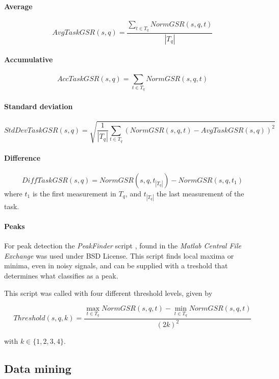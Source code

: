 \documentclass[11pt,leqno,a4paper]{report} %
\begin{document}
\paragraph{Average}

\[
AvgTaskGSR(s,q) = \frac { \sum_{t \in T_q} NormGSR(s,q,t) }
{\left\vert{T_q}\right\vert }
\]

\paragraph{Accumulative}

\[
AccTaskGSR(s,q) =  \sum_{t \in T_q} NormGSR(s,q,t)
\]

\paragraph{Standard deviation}

\[
StdDevTaskGSR(s,q) = \sqrt {\frac{1}{\left\vert{T_q}\right\vert}   \sum_{t \in T_q} (NormGSR(s,q,t) - AvgTaskGSR(s,q))^2 }
\]

\paragraph{Difference}

\[
DiffTaskGSR(s,q) = NormGSR(s,q, t_{\left\vert{T_q}\right\vert}) - NormGSR(s,q, t_1)
\]
where $t_1$ is the first measurement in $T_q$, and $t_{\left\vert{T_q}\right\vert}$ the last measurement of the task.

\paragraph{Peaks}
For peak detection the \emph{PeakFinder} script \citep{yoder}, found in the \emph{Matlab Central File Exchange} was used under BSD License. This script finds local maxima or minima, even in noisy signals, and can be supplied with a treshold that determines what classifies as a peak.

This script was called with four different threshold levels, given by

\[
Threshold(s,q,k) = \frac 
{\max_{t \in T_q} NormGSR(s,q,t) - \min_{t \in T_q} NormGSR(s,q,t)} 
{(2k)^2}
\]

with $k \in \{1,2,3,4\}$.


\subsection{Data mining}
\end{document}
